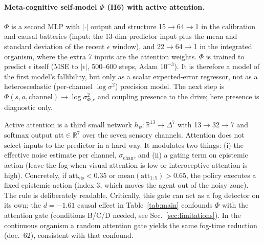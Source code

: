 \documentclass[11pt,a4paper]{article}
\begin{document}
\paragraph{Meta-cognitive self-model $\Phi$ (H6) with active attention.} $\Phi$ is a second MLP with $|\cdot|$ output and structure 15$\rightarrow$64$\rightarrow$1 in the calibration and causal batteries (input: the 13-dim predictor input plus the mean and standard deviation of the recent $\epsilon$ window), and 22$\rightarrow$64$\rightarrow$1 in the integrated organism, where the extra 7 inputs are the attention weights. $\Phi$ is trained to predict $\epsilon$ itself (MSE to $|\epsilon|$, 500--600 steps, Adam $10^{-3}$). It is therefore a model of the first model's fallibility, but only as a scalar expected-error regressor, not as a heteroscedastic (per-channel $\log \sigma^2$) precision model. The next step is $\Phi(s,a,\mathrm{channel})\rightarrow \log \sigma^2_{\Phi,c}$ and coupling $\mathrm{presence}$ to the drive; here $\mathrm{presence}$ is diagnostic only.

Active attention is a third small network $h_\psi: \mathbb{R}^{13} \rightarrow \Delta^7$ with 13$\rightarrow$32$\rightarrow$7 and softmax output $\mathrm{att} \in \mathbb{R}^7$ over the seven sensory channels. Attention does not select inputs to the predictor in a hard way. It modulates two things: (i) the effective noise estimate per channel, $\sigma_{\mathrm{chan}}$, and (ii) a gating term on epistemic action (leave the fog when visual attention is low or interoceptive attention is high). Concretely, if $\mathrm{att}_{\mathrm{vis}} < 0.35$ or $\mathrm{mean}(\mathrm{att}_{1:5}) > 0.65$, the policy executes a fixed epistemic action (index 3, which moves the agent out of the noisy zone). The rule is deliberately readable. Critically, this gate can act as a fog detector on its own; the $d=-1.61$ causal effect in Table~\ref{tab:main} confounds $\Phi$ with the attention gate (conditions B/C/D needed, see Sec.~\ref{sec:limitations}). In the continuous organism a random attention gate yields the same fog-time reduction (doc.~62), consistent with that confound.
\end{document}
